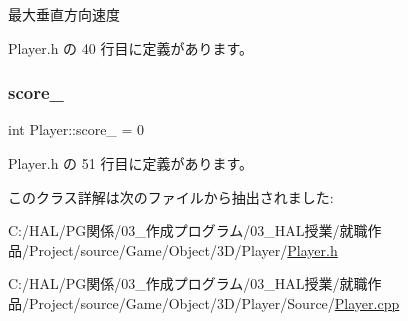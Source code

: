 最大垂直方向速度 



 Player.\+h の 40 行目に定義があります。

\mbox{\label{class_player_a423e2096b25d4965a84e4a8bf38c7683}} 
\subsubsection{\texorpdfstring{score\+\_\+}{score\_}}
{\footnotesize\ttfamily int Player\+::score\+\_\+ = 0\hspace{0.3cm}{\ttfamily [private]}}



 Player.\+h の 51 行目に定義があります。



このクラス詳解は次のファイルから抽出されました\+:\begin{DoxyCompactItemize}
\item 
C\+:/\+H\+A\+L/\+P\+G関係/03\+\_\+作成プログラム/03\+\_\+\+H\+A\+L授業/就職作品/\+Project/source/\+Game/\+Object/3\+D/\+Player/\mbox{\hyperlink{_player_8h}{Player.\+h}}\item 
C\+:/\+H\+A\+L/\+P\+G関係/03\+\_\+作成プログラム/03\+\_\+\+H\+A\+L授業/就職作品/\+Project/source/\+Game/\+Object/3\+D/\+Player/\+Source/\mbox{\hyperlink{_player_8cpp}{Player.\+cpp}}\end{DoxyCompactItemize}
